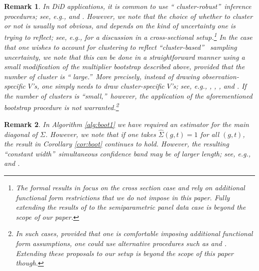 \documentclass[11pt]{article}%
\theoremstyle{plain}
\newtheorem{remark}{Remark}
\numberwithin{sassumption}{section}
\numberwithin{equation}{section}
\begin{document}
\begin{remark}
\label{rm:cluster}In DiD applications, it is common to use \textquotedblleft
cluster-robust\textquotedblright\ inference procedures; see, e.g.,
\cite{Wooldridge2003} and \cite{Bertrand2004}. However, we note that the
choice of whether to cluster or not is usually not obvious, and depends on the
kind of uncertainty one is trying to reflect; see, e.g., \cite{Abadie2017a}
for a discussion in a cross-sectional setup.\footnote{The formal results in
\cite{Abadie2017a} focus on the cross section case and rely on additional
functional form restrictions that we do not impose in this paper. Fully extending
the results of \cite{Abadie2017a} to the semiparametric panel data case is
beyond the scope of our paper.} In the case that one wishes to account for
clustering to reflect \textquotedblleft cluster-based\textquotedblright%
\ sampling uncertainty, we note that this can be done in a straightforward
manner using a small modification of the multiplier bootstrap described above,
provided that the number of cluster is \textquotedblleft
large.\textquotedblright\ More precisely, instead of drawing
observation-specific $V$'s, one simply needs to draw cluster-specific $V$'s;
see, e.g., \cite{Sherman2007a}, \cite{Kline2012}, \cite{Cheng2013}, and
\cite{Mackinnon2017,mackinnon2020randomization}. If the number of clusters is
\textquotedblleft small,\textquotedblright\ however, the application of the
aforementioned bootstrap procedure is not warranted.\footnote{In such cases,
provided that one is comfortable imposing additional functional form
assumptions, one could use alternative procedures such as \cite{Conley2011}
and \cite{Ferman2018}. Extending these proposals to our setup is beyond the
scope of this paper though.}
\end{remark}

\begin{remark}
\label{rm:studentization} In Algorithm \ref{alg:boot1} we have required an
estimator for the main diagonal of $\Sigma$. However, we note that if one
takes $\widehat{\Sigma}\left(  g,t\right)  =1$ for all $\left(  g,t\right)  $,
the result in Corollary \ref{cor:boot} continues to hold. However, the
resulting \textquotedblleft constant width\textquotedblright\ simultaneous
confidence band may be of larger length; see, e.g., \cite{MontielOlea2017} and
\cite{Freyberger2018}.
\end{remark}
\end{document}
